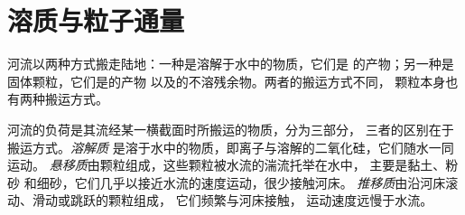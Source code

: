 \section{溶质与粒子通量}\label{sec:b1:erosion-transport:fluxes}

河流以两种方式搬走陆地：一种是溶解于水中的物质，它们是
的产物；另一种是固体颗粒，它们是的产物
以及的不溶残余物。两者的搬运方式不同，
颗粒本身也有两种搬运方式。

\begin{definition}\label{def:b1:erosion-transport:load}
河流的负荷是其流经某一横截面时所搬运的物质，分为三部分，
三者的区别在于搬运方式。\emph{溶解质}
是溶于水中的物质，即离子与溶解的二氧化硅，它们随水一同运动。
\emph{悬移质}由颗粒组成，这些颗粒被水流的湍流托举在水中，
主要是黏土、粉砂
和细砂，它们几乎以接近水流的速度运动，很少接触河床。
\emph{推移质}由沿河床滚动、滑动或跳跃的颗粒组成，
它们频繁与河床接触，
运动速度远慢于水流。
\end{definition}

